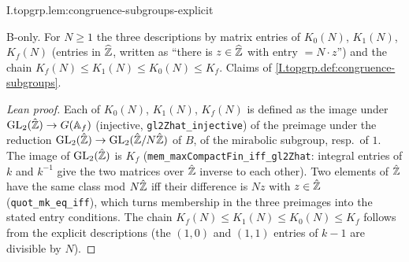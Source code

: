 \begin{lemma}
\bonly
{}
\end{lemma}
\begin{tfformal}{I.topgrp.lem:congruence-subgroups-explicit}
\begin{tffidelity}
B-only. For $N\ge1$ the three descriptions by matrix entries of $K_0(N)$, $K_1(N)$, $K_f(N)$ (entries in $\widehat{\mathbb{Z}}$, written as ``there is $z\in\widehat{\mathbb{Z}}$ with entry $=N\cdot z$'') and the chain $K_f(N)\le K_1(N)\le K_0(N)\le K_f$. Claims of \cref{I.topgrp.def:congruence-subgroups}.
\end{tffidelity}
\end{tfformal}
\begin{proof}[Lean proof]
Each of $K_0(N)$, $K_1(N)$, $K_f(N)$ is defined as the image under $\mathrm{GL}_2(\hat{\mathbb{Z}})\to G(\mathbb{A}_f)$ (injective, \texttt{gl2Zhat\_injective}) of the preimage under the reduction $\mathrm{GL}_2(\hat{\mathbb{Z}})\to\mathrm{GL}_2(\hat{\mathbb{Z}}/N\hat{\mathbb{Z}})$ of $B$, of the mirabolic subgroup, resp.\ of $1$. The image of $\mathrm{GL}_2(\hat{\mathbb{Z}})$ is $K_f$ (\texttt{mem\_maxCompactFin\_iff\_gl2Zhat}: integral entries of $k$ and $k^{-1}$ give the two matrices over $\hat{\mathbb{Z}}$ inverse to each other). Two elements of $\hat{\mathbb{Z}}$ have the same class mod $N\hat{\mathbb{Z}}$ iff their difference is $Nz$ with $z\in\hat{\mathbb{Z}}$ (\texttt{quot\_mk\_eq\_iff}), which turns membership in the three preimages into the stated entry conditions. The chain $K_f(N)\le K_1(N)\le K_0(N)\le K_f$ follows from the explicit descriptions (the $(1,0)$ and $(1,1)$ entries of $k-1$ are divisible by $N$).
\end{proof}


